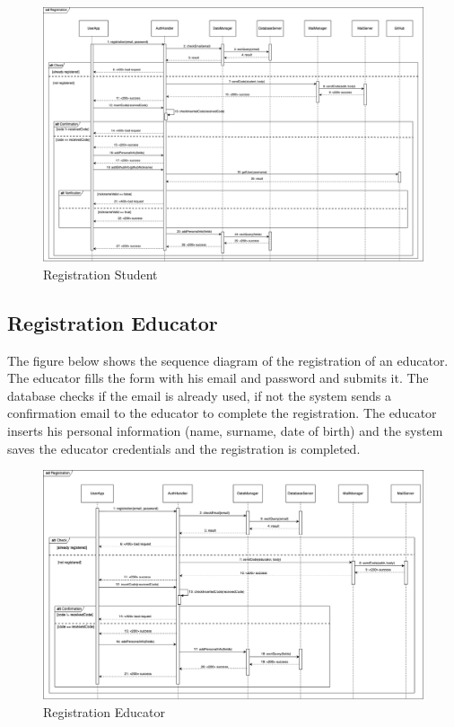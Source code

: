 \begin{figure}[H]
    \centering
    \includegraphics[width=1\textwidth]{images/seq_diagrams/RegistrationStd_DD.png}
    \caption{Registration Student}
\end{figure}

\subsection{Registration Educator}
The figure below shows the sequence diagram of the registration of an educator. The educator fills the form with his email and password and submits it. 
The database checks if the email is already used, if not the system sends a confirmation email to the educator to complete the registration. 
The educator inserts his personal information (name, surname, date of birth) and the system saves the educator credentials and the registration is completed.
\begin{figure}[H]
    \centering
    \includegraphics[width=1\textwidth]{images/seq_diagrams/RegistrationEd_DD.png}
    \caption{Registration Educator}
\end{figure}

